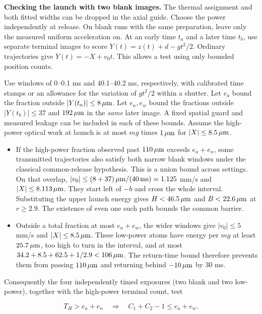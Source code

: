 \documentclass[11pt,a4paper]{article}
\newcommand{\tightlist}{\setlength{\itemsep}{0pt}\setlength{\parskip}{0pt}}
\begin{document}
\textbf{Checking the launch with two blank images.} The thermal
assignment and both fitted widths can be dropped in the axial guide.
Choose the power independently at release. On blank runs with the same
preparation, leave only the measured uniform acceleration on. At an
early time \(t_a\) and a later time \(t_b\), use separate terminal
images to score \(Y(t)=z(t)+d-gt^2/2\). Ordinary trajectories give
\(Y(t)=-X+v_0t\). This allows a test using only bounded position counts.

Use windows of 0--0.1 ms and 40.1--40.2 ms, respectively, with
calibrated time stamps or an allowance for the variation of \(gt^2/2\)
within a shutter. Let \(e_a\) bound the fraction outside
\(|Y(t_a)|\le8\,\mu{\rm m}\). Let \(e_n,e_w\) bound the fractions
outside \(|Y(t_b)|\le37\) and \(192\,\mu{\rm m}\) in the \emph{same}
later image. A fixed spatial guard and measured leakage can be included
in each of these bounds. Assume the high-power optical work at launch is
at most \(mg\) times \(1\,\mu{\rm m}\) for \(|X|\le8.5\,\mu{\rm m}\).

\begin{itemize}
\tightlist
\item
  If the high-power fraction observed past \(110\,\mu{\rm m}\) exceeds
  \(e_a+e_n\), some transmitted trajectories also satisfy both narrow
  blank windows under the classical common-release hypothesis. This is a
  union bound across settings. On that overlap,
  \(|v_0|\le(8+37)\,\mu{\rm m}/(40\,{\rm ms})=1.125\) mm/s and
  \(|X|\le8.113\,\mu{\rm m}\). They start left of \(-b\) and cross the
  whole interval. Substituting the upper launch energy gives
  \(H<46.5\,\mu{\rm m}\) and \(B<22.6\,\mu{\rm m}\) at \(r\ge2.9\). The
  existence of even one such path bounds the common barrier.
\item
  Outside a total fraction at most \(e_a+e_w\), the wider windows give
  \(|v_0|\le5\) mm/s and \(|X|\le8.5\,\mu{\rm m}\). These low-power
  atoms have energy per \(mg\) at least \(25.7\,\mu{\rm m}\), too high
  to turn in the interval, and at most
  \(34.2+8.5+62.5+1/2.9<106\,\mu{\rm m}\). The return-time bound
  therefore prevents them from passing \(110\,\mu{\rm m}\) and returning
  behind \(-10\,\mu{\rm m}\) by 30 ms.
\end{itemize}

Consequently the four independently timed exposures (two blank and two
low-power), together with the high-power terminal count, test

\[
 T_H>e_a+e_n
 \quad\Longrightarrow\quad C_1+C_2-1\le e_a+e_w .
\]
\end{document}

